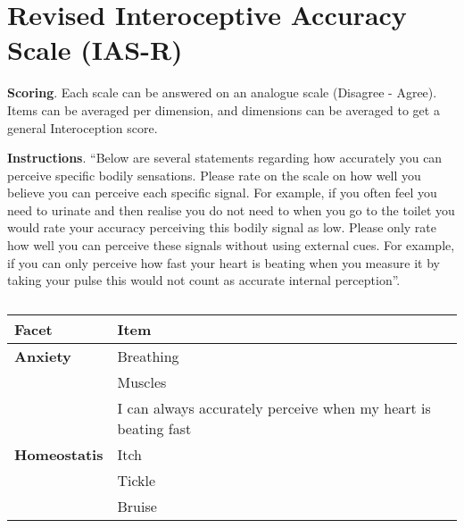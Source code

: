 \documentclass[
  man,floatsintext]{apa6}
\begin{document}
\newpage

\hypertarget{revised-interoceptive-accuracy-scale-ias-r}{%
\section{Revised Interoceptive Accuracy Scale (IAS-R)}\label{revised-interoceptive-accuracy-scale-ias-r}}

\textbf{Scoring}. Each scale can be answered on an analogue scale (Disagree - Agree). Items can be averaged per dimension, and dimensions can be averaged to get a general Interoception score.

\textbf{Instructions}. ``Below are several statements regarding how accurately you can perceive specific bodily sensations. Please rate on the scale on how well you believe you can perceive each specific signal. For example, if you often feel you need to urinate and then realise you do not need to when you go to the toilet you would rate your accuracy perceiving this bodily signal as low. Please only rate how well you can perceive these signals without using external cues. For example, if you can only perceive how fast your heart is beating when you measure it by taking your pulse this would not count as accurate internal perception''.

\begin{table}[!h]

\begin{center}
\begin{threeparttable}

\caption{\label{tab:unnamed-chunk-2}}

\scriptsize{

\begin{tabular}{ll}
\toprule
Facet & Item\\
\midrule
\textbf{Anxiety} & Breathing\\
 & Muscles\\
 & I can always accurately perceive when my heart is beating fast\\ \midrule
\textbf{Homeostatis} & Itch\\
 & Tickle\\
 & Bruise\\
\bottomrule
\end{tabular}

}

\end{threeparttable}
\end{center}

\end{table}
\end{document}

